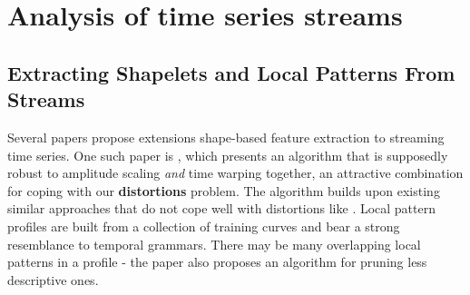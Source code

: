 %

	\section{Analysis of time series streams}
	\label{sec:timeseriesstreams}
	
	\subsection{Extracting Shapelets and Local Patterns From Streams}
	Several papers propose extensions shape-based feature extraction to streaming time series. One such paper is \citep{chen2007spade}, which presents an algorithm that is supposedly robust to amplitude scaling \emph{and} time warping together, an attractive combination for coping with our \textbf{distortions} problem. The algorithm builds upon existing similar approaches that do not cope well with distortions like \citep{wu2004online}. Local pattern profiles are built from a collection of training curves and bear a strong resemblance to temporal grammars. There may be many overlapping local patterns in a profile - the paper also proposes an algorithm for pruning less descriptive ones.
